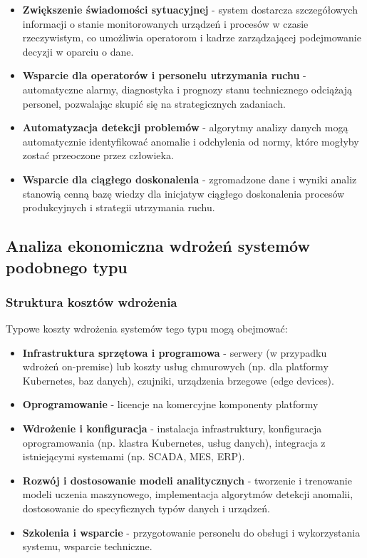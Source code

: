 \begin{itemize}
    \item \textbf{Zwiększenie świadomości sytuacyjnej} - system dostarcza szczegółowych informacji o stanie monitorowanych urządzeń i procesów w czasie rzeczywistym, co umożliwia operatorom i kadrze zarządzającej podejmowanie decyzji w oparciu o dane.
    \item \textbf{Wsparcie dla operatorów i personelu utrzymania ruchu} - automatyczne alarmy, diagnostyka i prognozy stanu technicznego odciążają personel, pozwalając skupić się na strategicznych zadaniach.
    \item \textbf{Automatyzacja detekcji problemów} - algorytmy analizy danych mogą automatycznie identyfikować anomalie i odchylenia od normy, które mogłyby zostać przeoczone przez człowieka.
    \item \textbf{Wsparcie dla ciągłego doskonalenia} - zgromadzone dane i wyniki analiz stanowią cenną bazę wiedzy dla inicjatyw ciągłego doskonalenia procesów produkcyjnych i strategii utrzymania ruchu.
\end{itemize}

\subsection{Analiza ekonomiczna wdrożeń systemów podobnego typu}
\label{subsec:analiza_ekonomiczna}

\subsubsection{Struktura kosztów wdrożenia}
\label{subsubsec:struktura_kosztow}

Typowe koszty wdrożenia systemów tego typu mogą obejmować:

\begin{itemize}
    \item \textbf{Infrastruktura sprzętowa i programowa} - serwery (w przypadku wdrożeń on-premise) lub koszty usług chmurowych (np. dla platformy Kubernetes, baz danych), czujniki, urządzenia brzegowe (edge devices).
    \item \textbf{Oprogramowanie} - licencje na komercyjne komponenty platformy
    \item \textbf{Wdrożenie i konfiguracja} - instalacja infrastruktury, konfiguracja oprogramowania (np. klastra Kubernetes, usług danych), integracja z istniejącymi systemami (np. SCADA, MES, ERP).
    \item \textbf{Rozwój i dostosowanie modeli analitycznych} - tworzenie i trenowanie modeli uczenia maszynowego, implementacja algorytmów detekcji anomalii, dostosowanie do specyficznych typów danych i urządzeń.
    \item \textbf{Szkolenia i wsparcie} - przygotowanie personelu do obsługi i wykorzystania systemu, wsparcie techniczne.
\end{itemize}

